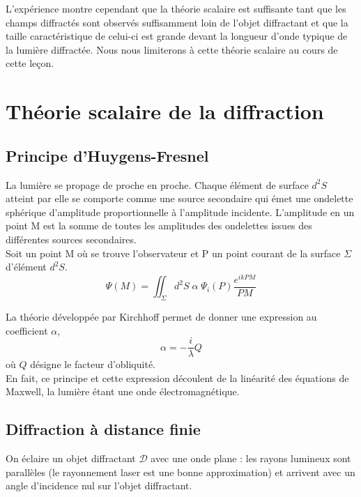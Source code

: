 \documentclass[11pt,a4paper]{report}
\begin{document}
L'expérience montre cependant que la théorie scalaire est suffisante tant que les champs diffractés sont observés suffisamment loin de l'objet diffractant et que la taille caractéristique de celui-ci est grande devant la longueur d'onde typique de la lumière diffractée. Nous nous limiterons à cette théorie scalaire au cours de cette leçon.

\newpage
\section{Théorie scalaire de la diffraction}

\subsection{Principe d'Huygens-Fresnel}

La lumière se propage de proche en proche. Chaque élément de surface $d^2S$ atteint par elle se comporte comme une source secondaire qui émet une ondelette sphérique d'amplitude proportionnelle à l'amplitude incidente. L'amplitude en un point M est la somme de toutes les amplitudes des ondelettes issues des différentes sources secondaires.\\

Soit un point M où se trouve l'observateur et P un point courant de la surface $\Sigma$ d'élément $d^2S$.
\begin{equation}
	\Psi(M) = \iint_\Sigma d^2S\; \alpha\;  \Psi_i(P) \frac{\displaystyle{e^{ikPM}}}{PM}
\end{equation}

La théorie développée par Kirchhoff permet de donner une expression au coefficient $\alpha$,
\begin{equation}
	\alpha = -\frac{i}{\lambda}Q
\end{equation}
où $Q$ désigne le facteur d'obliquité.\\

En fait, ce principe et cette expression découlent de la linéarité des équations de Maxwell, la lumière étant une onde électromagnétique.

\subsection{Diffraction à distance finie}

On éclaire un objet diffractant $\mathcal{D}$ avec une onde plane : les rayons lumineux sont parallèles (le rayonnement laser est une bonne approximation) et arrivent avec un angle d'incidence nul sur l'objet diffractant.\\
\end{document}
